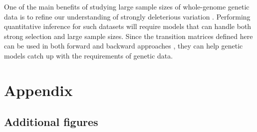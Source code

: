 \documentclass[review,nonatbib]{elsarticle}
\begin{document}
One of the main benefits of studying large sample sizes of whole-genome genetic data is to refine
our understanding of strongly deleterious variation \cite{karczewski2020mutational}. Performing
quantitative inference for such datasets will require models that can handle both strong selection
and large sample sizes.  Since the transition matrices defined here can be used in both forward
\citep{JouganousEtAl2017} and backward approaches \cite{KammEtAl2017}, they can help genetic models
catch up with the requirements of genetic data.

\printbibliography

\section{Appendix}

\newcommand{\beginsupplement}{%
        \setcounter{table}{0}
        \renewcommand{\thetable}{S\arabic{table}}%
        \setcounter{figure}{0}
        \renewcommand{\thefigure}{S\arabic{figure}}%
     }
\beginsupplement

\subsection{Additional figures}
\label{subsec_apx_figures}
\end{document}
